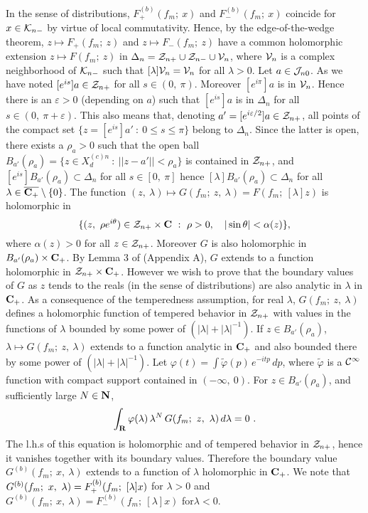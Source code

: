 \documentclass[a4paper,a4paper]{article}
\def\bC{{\bf C}}
\def\bR{{\bf R}}
\def\bN{{\bf N}}
\def\CC{{\cal C}}
\def\JJ{{\cal J}}
\def\KK{{\cal K}}
\def\VV{{\cal V}}
\def\ZZ{{\cal Z}}
\def\wt{\widetilde}
\def\ovl{\overline}
\def \vhi{\varphi}
\def \veps{\varepsilon}
\def\Xcdn{X_d^{(c)n}}
\begin{document}
In the sense of distributions,
$F_+^{(b)}({f_m};\ x)$ and $F_-^{(b)}({f_m};\ x)$ coincide for
$x \in \KK_{n-}$ by virtue of local commutativity.
Hence, by the edge-of-the-wedge theorem, $z\mapsto F_+({f_m};\ z)$
and $z\mapsto F_-({f_m};\ z)$ have a common holomorphic extension
$z\mapsto F({f_m};\ z)$ in
$\Delta_n = \ZZ_{n+} \cup \ZZ_{n-} \cup \VV_n$, where
$\VV_n$ is a complex neighborhood of $\KK_{n-}$ such that
$[\lambda]\VV_n = \VV_n$ for all $\lambda >0$. Let $a \in \JJ_{n0}$.
As we have noted $[e^{is}]a \in \ZZ_{n+}$ for all $s \in (0,\ \pi)$.
Moreover $[e^{i\pi}]a$ is in $\VV_n$. Hence there is an $\veps >0$
(depending on $a$) such that $[e^{is}]a$ is in $\Delta_n$ for all
$s \in (0,\ \pi+\veps)$. This also means that, denoting
$a' = [e^{i\veps/2}]a \in \ZZ_{n+}$, all points of the compact set
$\{z = [e^{is}]a'\ :\ 0 \le s \le \pi\}$ belong to $\Delta_n$.
Since the latter is open, there exists a $\rho_a >0$ such that
the open ball $B_{a'}(\rho_a) =\{z\in \Xcdn\ :\ ||z-a'|| < \rho_a\}$
is contained in $\ZZ_{n+}$, and
$[e^{is}]B_{a'}(\rho_a) \subset \Delta_n$ for all $s\in [0,\ \pi]$
hence $[\lambda] B_{a'}(\rho_a) \subset \Delta_n$ for all
$\lambda \in \ovl{\bC_+}\setminus \{0\}$. The function
$(z,\ \lambda) \mapsto G(f_m;\ z,\ \lambda) = F(f_m;\ [\lambda]z)$
is holomorphic in
\begin{equation}
\{(z,\ \rho e^{i\theta}) \in \ZZ_{n+}\times \bC\ :\
\rho > 0,\ \ \ |\sin \theta| < \alpha(z)\},
\label{5.14}\end{equation}
where $\alpha(z) > 0$ for all $z \in \ZZ_{n+}$. Moreover
$G$ is also holomorphic in $B_{a'}(\rho_a) \times \bC_+$.
By Lemma 3 of \cite{BEM} (Appendix A), $G$ extends to a function
holomorphic in $\ZZ_{n+}\times \bC_+$. However we wish to
prove that the boundary values of $G$ as $z$ tends to the reals
(in the sense of distributions) are also analytic in $\lambda$
in $\bC_+$. As a consequence of the temperedness assumption,
for real $\lambda$, $G(f_m;\ z,\ \lambda)$ defines a holomorphic function
of tempered behavior in $\ZZ_{n+}$ with values in the functions
of $\lambda$ bounded by some power of $(|\lambda| +|\lambda|^{-1})$.
If $z \in B_{a'}(\rho_a)$, $\lambda \mapsto G(f_m;\ z,\ \lambda)$ extends to
a function analytic in $\bC_+$ and also bounded there by
some power of $(|\lambda| +|\lambda|^{-1})$. Let
$\vhi(t) = \int \wt \vhi(p)\,e^{-itp}\,dp$, where
$\wt \vhi$ is a $\CC^\infty$ function with compact support contained in
$(-\infty,\ 0)$. For $z \in B_{a'}(\rho_a)$, and sufficiently
large $N \in \bN$,
\begin{equation}
\int_\bR \vhi(\lambda)\,\lambda^N\,G(f_m;\ z,\ \lambda)\,d\lambda = 0\ .
\label{5.15}\end{equation}
The l.h.s of this equation is holomorphic and of tempered behavior
in $\ZZ_{n+}$, hence it vanishes together with its boundary values.
Therefore the boundary value $G^{(b)}(f_m;\ x,\ \lambda)$ extends to
a function of $\lambda$ holomorphic in $\bC_+$. We note that
$G^{(b)}(f_m;\ x,\ \lambda) = F_+^{(b)}({f_m};\linebreak[0]\ [\lambda]x)$ for
$\lambda > 0$ and $G^{(b)}(f_m;\ x,\ \lambda) = F_-^{(b)}({f_m};\ [\lambda]x)$
for$\lambda < 0$.
\end{document}
